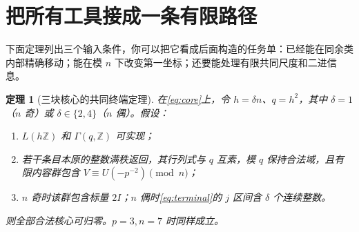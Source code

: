 \documentclass[11pt,a4paper,oneside,openany]{book}
\newcommand{\Z}{\mathbb Z}
\newtheorem{theorem}{定理}[chapter]
\theoremstyle{definition}
\numberwithin{equation}{chapter}
\begin{document}
\section{把所有工具接成一条有限路径}
下面定理列出三个输入条件，你可以把它看成后面构造的任务单：已经能在同余类内部精确移动；能在模 $n$ 下改变第一坐标；还要能处理有限共同尺度和二进信息。
\begin{theorem}[三块核心的共同终端定理]\label{thm:terminal}
在\eqref{eq:core}上，令 $h=\delta n$、$q=h^2$，其中 $\delta=1$（$n$ 奇）或 $\delta\in\{2,4\}$（$n$ 偶）。假设：
\begin{enumerate}
\item $L(h\Z)$ 和 $\Gamma(q,\Z)$ 可实现；
\item 若干条目本原的整数满秩返回，其行列式与 $q$ 互素，模 $q$ 保持合法域，且有限内容群包含 $V\equiv U(-p^{-2})\pmod n$；
\item $n$ 奇时该群包含标量 $2I$；$n$ 偶时\eqref{eq:terminal}的 $j$ 区间含 $\delta$ 个连续整数。
\end{enumerate}
则全部合法核心可归零。$p=3,n=7$ 时同样成立。
\end{theorem}
\end{document}
